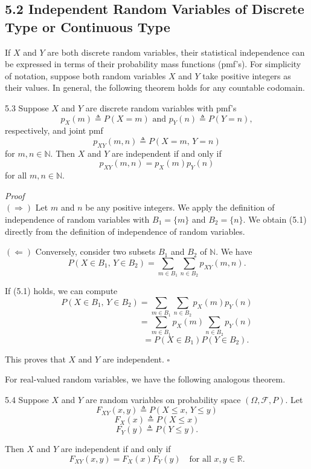 \subsection*{5.2 Independent Random Variables of Discrete Type or Continuous Type}

If $X$ and $Y$ are both discrete random variables, their statistical independence can be expressed in terms of their probability mass functions (pmf's). For simplicity of notation, suppose both random variables $X$ and $Y$ take positive integers as their values. In general, the following theorem holds for any countable codomain.

\begin{thmbox}{5.3}
Suppose $X$ and $Y$ are discrete random variables with pmf's
\[
p_X(m) \triangleq P(X=m) \text{ and } p_Y(n) \triangleq P(Y=n),
\]
respectively, and joint pmf
\[
p_{XY}(m,n) \triangleq P(X=m,\, Y=n)
\]
for $m,n \in \mathbb{N}$. Then $X$ and $Y$ are independent if and only if
\begin{equation}
p_{XY}(m,n)=p_X(m)p_Y(n)
\tag{5.1}
\end{equation}
for all $m,n \in \mathbb{N}$.
\end{thmbox}

\textit{Proof} \\
$(\Rightarrow)$ Let $m$ and $n$ be any positive integers. We apply the definition of independence of random variables with $B_1=\{m\}$ and $B_2=\{n\}$. We obtain (5.1) directly from the definition of independence of random variables.

$(\Leftarrow)$ Conversely, consider two subsets $B_1$ and $B_2$ of $\mathbb{N}$. We have
\[
P(X \in B_1,\, Y \in B_2)=\sum_{m \in B_1}\sum_{n \in B_2} p_{XY}(m,n).
\]

If (5.1) holds, we can compute
\[
P(X \in B_1,\, Y \in B_2)=\sum_{m \in B_1}\sum_{n \in B_2} p_X(m)p_Y(n)
\]
\[
\phantom{P(X \in B_1,\, Y \in B_2)}=\sum_{m \in B_1} p_X(m)\sum_{n \in B_2} p_Y(n)
\]
\[
\phantom{P(X \in B_1,\, Y \in B_2)}=P(X \in B_1)P(Y \in B_2).
\]

This proves that $X$ and $Y$ are independent. \hfill $\square$

For real-valued random variables, we have the following analogous theorem.

\begin{thmbox}{5.4}
Suppose $X$ and $Y$ are random variables on probability space $(\Omega,\mathcal{F},P)$. Let
\[
F_{XY}(x,y) \triangleq P(X \le x,\, Y \le y)
\]
\[
F_X(x) \triangleq P(X \le x)
\]
\[
F_Y(y) \triangleq P(Y \le y).
\]

Then $X$ and $Y$ are independent if and only if
\[
F_{XY}(x,y)=F_X(x)F_Y(y) \quad \text{for all } x,y \in \mathbb{R}.
\]
\end{thmbox}

